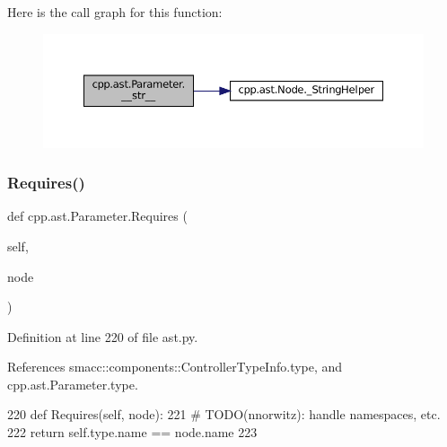 Here is the call graph for this function\+:
\nopagebreak
\begin{figure}[H]
\begin{center}
\leavevmode
\includegraphics[width=350pt]{classcpp_1_1ast_1_1Parameter_aabfbabb3c744a0da4a012ceb4299947a_cgraph}
\end{center}
\end{figure}
\mbox{\label{classcpp_1_1ast_1_1Parameter_a4bc5c17a0d606d35be40cb4c2c1a67a6}} 
\subsubsection{\texorpdfstring{Requires()}{Requires()}}
{\footnotesize\ttfamily def cpp.\+ast.\+Parameter.\+Requires (\begin{DoxyParamCaption}\item[{}]{self,  }\item[{}]{node }\end{DoxyParamCaption})}



Definition at line 220 of file ast.\+py.



References smacc\+::components\+::\+Controller\+Type\+Info.\+type, and cpp.\+ast.\+Parameter.\+type.


\begin{DoxyCode}
220     \textcolor{keyword}{def }Requires(self, node):
221         \textcolor{comment}{# TODO(nnorwitz): handle namespaces, etc.}
222         \textcolor{keywordflow}{return} self.type.name == node.name
223 
\end{DoxyCode}


